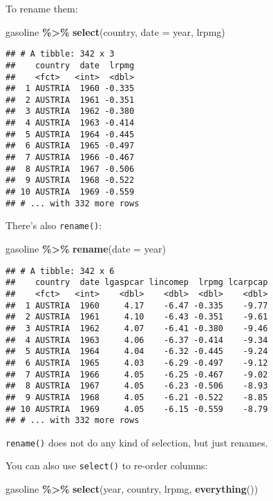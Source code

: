 \documentclass[
]{article}
\newenvironment{Shaded}{\begin{snugshade}}{\end{snugshade}}
\newcommand{\DataTypeTok}[1]{\textcolor[rgb]{0.13,0.29,0.53}{#1}}
\newcommand{\KeywordTok}[1]{\textcolor[rgb]{0.13,0.29,0.53}{\textbf{#1}}}
\newcommand{\NormalTok}[1]{#1}
\newcommand{\OperatorTok}[1]{\textcolor[rgb]{0.81,0.36,0.00}{\textbf{#1}}}
\newcommand{\StringTok}[1]{\textcolor[rgb]{0.31,0.60,0.02}{#1}}
\begin{document}
To rename them:

\begin{Shaded}
\begin{Highlighting}[]
\NormalTok{gasoline }\OperatorTok{\%\textgreater{}\%}\StringTok{ }\KeywordTok{select}\NormalTok{(country, }\DataTypeTok{date =}\NormalTok{ year, lrpmg)}
\end{Highlighting}
\end{Shaded}

\begin{verbatim}
## # A tibble: 342 x 3
##    country  date  lrpmg
##    <fct>   <int>  <dbl>
##  1 AUSTRIA  1960 -0.335
##  2 AUSTRIA  1961 -0.351
##  3 AUSTRIA  1962 -0.380
##  4 AUSTRIA  1963 -0.414
##  5 AUSTRIA  1964 -0.445
##  6 AUSTRIA  1965 -0.497
##  7 AUSTRIA  1966 -0.467
##  8 AUSTRIA  1967 -0.506
##  9 AUSTRIA  1968 -0.522
## 10 AUSTRIA  1969 -0.559
## # ... with 332 more rows
\end{verbatim}

There's also \texttt{rename()}:

\begin{Shaded}
\begin{Highlighting}[]
\NormalTok{gasoline }\OperatorTok{\%\textgreater{}\%}
\StringTok{  }\KeywordTok{rename}\NormalTok{(}\DataTypeTok{date =}\NormalTok{ year)}
\end{Highlighting}
\end{Shaded}

\begin{verbatim}
## # A tibble: 342 x 6
##    country  date lgaspcar lincomep  lrpmg lcarpcap
##    <fct>   <int>    <dbl>    <dbl>  <dbl>    <dbl>
##  1 AUSTRIA  1960     4.17    -6.47 -0.335    -9.77
##  2 AUSTRIA  1961     4.10    -6.43 -0.351    -9.61
##  3 AUSTRIA  1962     4.07    -6.41 -0.380    -9.46
##  4 AUSTRIA  1963     4.06    -6.37 -0.414    -9.34
##  5 AUSTRIA  1964     4.04    -6.32 -0.445    -9.24
##  6 AUSTRIA  1965     4.03    -6.29 -0.497    -9.12
##  7 AUSTRIA  1966     4.05    -6.25 -0.467    -9.02
##  8 AUSTRIA  1967     4.05    -6.23 -0.506    -8.93
##  9 AUSTRIA  1968     4.05    -6.21 -0.522    -8.85
## 10 AUSTRIA  1969     4.05    -6.15 -0.559    -8.79
## # ... with 332 more rows
\end{verbatim}

\texttt{rename()} does not do any kind of selection, but just renames.

You can also use \texttt{select()} to re-order columns:

\begin{Shaded}
\begin{Highlighting}[]
\NormalTok{gasoline }\OperatorTok{\%\textgreater{}\%}\StringTok{ }\KeywordTok{select}\NormalTok{(year, country, lrpmg, }\KeywordTok{everything}\NormalTok{())}
\end{Highlighting}
\end{Shaded}
\end{document}
